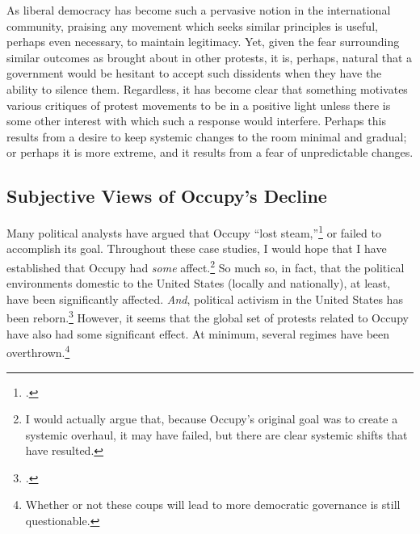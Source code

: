 \documentclass[openany,twoside]{memoir}
\begin{document}
\begin{Spacing}{2}
As liberal democracy has become such a pervasive notion in the international community, praising any movement which seeks similar principles is useful, perhaps even necessary, to maintain legitimacy.
Yet, given the fear surrounding similar outcomes as brought about in other protests, it is, perhaps, natural that a government would be hesitant to accept such dissidents when they have the ability to silence them.
Regardless, it has become clear that something motivates various critiques of protest movements to be in a positive light unless there is some other interest with which such a response would interfere.
Perhaps this results from a desire to keep systemic changes to the room minimal and gradual; or perhaps it is more extreme, and it results from a fear of unpredictable changes.

\subsection{Subjective Views of Occupy's Decline}
Many political analysts have argued that Occupy ``lost steam,''\footcite{meyer13}
or failed to accomplish its goal.
Throughout these case studies, I would hope that I have established that Occupy had \emph{some} affect.\footnote{
I would actually argue that, because Occupy's original goal was to create a systemic overhaul, it may have failed, but there are clear systemic shifts that have resulted.}
So much so, in fact, that the political environments domestic to the United States (locally and nationally), at least, have been significantly affected.
\emph{And}, political activism in the United States has been reborn.\footcite{wedes13}
However, it seems that the global set of protests related to Occupy have also had some significant effect.
At minimum, several regimes have been overthrown.\footnote{Whether or not these coups will lead to more democratic governance is still questionable.}


\end{Spacing}
\end{document}
